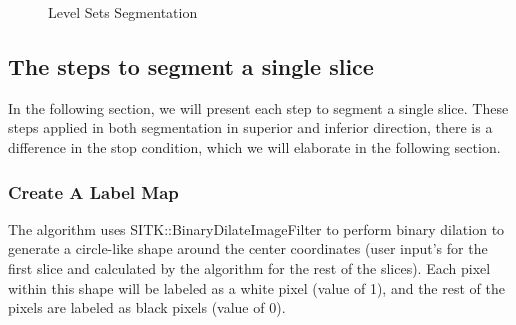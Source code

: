 \begin{figure}[H] 
\centering
{}%
%
%
\caption[Level Sets Segmentation]{Level Sets Segmentation}
\label{LSS}
\end{figure}

\subsection{The steps to segment a single slice}
In the following section, we will present each step to segment a single slice. These steps applied in both segmentation in superior and inferior direction, there is a difference in the stop condition, which we will elaborate in the following section.
\subsubsection{Create A Label Map}
The algorithm uses SITK::BinaryDilateImageFilter to perform binary dilation to generate a circle-like shape around the center coordinates (user input’s for the first slice and calculated by the algorithm for the rest of the slices). Each pixel within this shape will be labeled as a white pixel (value of 1), and the rest of the pixels are labeled as black pixels (value of 0). 

